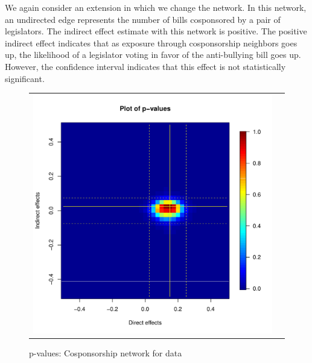 \documentclass[12pt]{article}
\begin{document}
We again consider an extension in which we change the network. In this network, an undirected edge represents the number of bills cosponsored by a pair of legislators. The indirect effect estimate with this network is positive. The positive indirect effect indicates that as exposure through cosponsorship neighbors goes up, the likelihood of a legislator voting in favor of the anti-bullying bill goes up. However, the confidence interval indicates that this effect is not statistically significant.

\begin{figure}
	\centering
	\begin{tabular}{cc}
	\includegraphics[scale=0.45]{./images/pval_plot_bergan_cospon.pdf}
	\end{tabular}
	\caption{p-values: Cosponsorship network for \citet{bergan2015call} data}
\end{figure}
\end{document}
